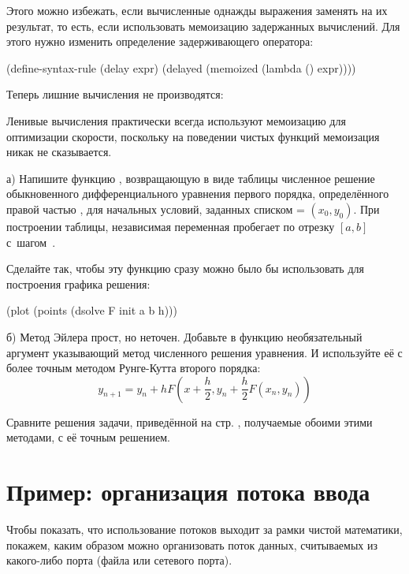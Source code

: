 Этого можно избежать, если вычисленные однажды выражения заменять на их результат, то есть, если использовать мемоизацию задержанных вычислений. Для этого нужно изменить определение задерживающего оператора:
\begin{Definition}
(define-syntax-rule (delay expr)
  (delayed (memoized (lambda () expr))))
\end{Definition}
Теперь лишние вычисления не производятся:
\vspace{-\smallskipamount}
\vspace{-\smallskipamount}
\vspace{-\smallskipamount}
\vspace{-\smallskipamount}

Ленивые вычисления практически всегда используют мемоизацию для оптимизации скорости, поскольку на поведении чистых функций мемоизация никак не сказывается.

\begin{Assignment}
а) Напишите функцию , возвращающую в виде таблицы численное решение обыкновенного дифференциального уравнения первого порядка, определённого правой частью , для начальных условий, заданных списком  = $(x_0,y_0)$. При построении таблицы, независимая переменная пробегает по отрезку $[a,b]$ с~шагом~.

\newpage
Сделайте так, чтобы эту функцию сразу можно было бы использовать для построения графика решения:
\begin{SchemeCode}[emph={F,init,a,b,h}]
(plot (points (dsolve F init a b h)))
\end{SchemeCode}

б) Метод Эйлера прост, но неточен. Добавьте в функцию  необязательный аргумент указывающий метод численного решения уравнения. И используйте её с более точным методом Рунге-Кутта второго порядка: $$y_{n+1} = y_n + h F\left(x+\frac{h}2,y_n + \frac{h}2F(x_n,y_n)\right)$$

Сравните решения задачи, приведённой на стр. \pageref{ode}, получаемые обоими этими методами, с её точным решением.

\end{Assignment}

\section{Пример: организация потока ввода}%
Чтобы показать, что использование потоков выходит за рамки чистой математики, покажем, каким образом можно организовать поток данных, считываемых из какого-либо порта (файла или сетевого порта).

